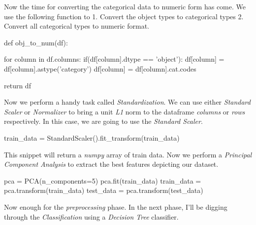 \documentclass[12pt]{article}
\numberwithin{equation}{section}
\numberwithin{table}{section}
\numberwithin{figure}{section}
\begin{document}
Now the time for converting the categorical data to numeric form has come. We use the following function to 1. Convert the object types to categorical types 2. Convert all categorical types to numeric format.
\begin{python}
	def obj_to_num(df):
	
	for column in df.columns:
		if(df[column].dtype == 'object'):
			df[column] = df[column].astype('category')
			df[column] = df[column].cat.codes
	
	return df
\end{python} 
Now we perform a handy task called \textit{Standardization}. We can use either \textit{Standard Scaler} or \textit{Normalizer} to bring a unit \textit{L1} norm to the dataframe \textit{columns} or \textit{rows} respectively. In this case, we are going to use the \textit{Standard Scaler}.
\begin{python}
	train_data = StandardScaler().fit_transform(train_data)
\end{python}
This snippet will return a \textit{numpy} array of train data. Now we perform a \textit{Principal Component Analysis} to extract the best features depicting our dataset.
\begin{python}
	pca = PCA(n_components=5)
	pca.fit(train_data)
	train_data = pca.transform(train_data)
	test_data = pca.transform(test_data)
\end{python}
Now enough for the \textit{preprocessing} phase. In the next phase, I'll be digging through the \textit{Classification} using a \textit{Decision Tree} classifier.
\end{document}

